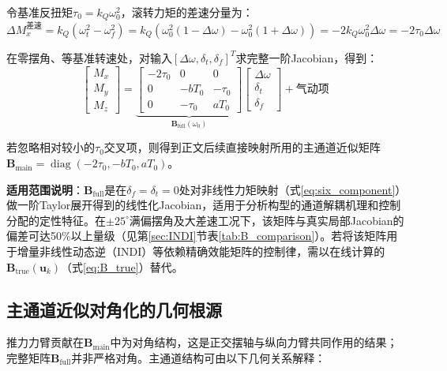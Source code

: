 令基准反扭矩$\tau_0 = k_Q \omega_0^2$，滚转力矩的差速分量为：
\begin{equation}
    \Delta M_x^{\text{差速}} = k_Q (\omega_t^2 - \omega_f^2)
    = k_Q (\omega_0^2(1-\Delta\omega) - \omega_0^2(1+\Delta\omega))
    = -2 k_Q \omega_0^2 \Delta\omega
    = -2 \tau_0 \Delta\omega
    \label{eq:differential_roll}
\end{equation}

在零摆角、等基准转速处，对输入$[\Delta\omega,\delta_t,\delta_f]^T$求完整一阶Jacobian，得到：
\begin{equation}
    \boxed{
    \begin{bmatrix} M_x \\ M_y \\ M_z \end{bmatrix}
    =
    \underbrace{
    \begin{bmatrix}
        -2\tau_0 & 0 & 0 \\
        0 & -b T_0 & -\tau_0 \\
        0 & -\tau_0 & a T_0
    \end{bmatrix}
    }_{\bm{B}_{\mathrm{full}}(\omega_0)}
    \begin{bmatrix} \Delta\omega \\ \delta_t \\ \delta_f \end{bmatrix}
    + \text{气动项}
    }
    \label{eq:effectiveness_matrix}
\end{equation}

若忽略相对较小的$\tau_0$交叉项，则得到正文后续直接映射所用的主通道近似矩阵
$\bm{B}_{\mathrm{main}}=\operatorname{diag}(-2\tau_0,-bT_0,aT_0)$。

\textbf{适用范围说明}：$\mathbf{B}_{\mathrm{full}}$是在$\delta_f=\delta_t=0$处对非线性力矩映射（式\ref{eq:six_component}）做一阶Taylor展开得到的线性化Jacobian，适用于分析构型的通道解耦机理和控制分配的定性特征。在$\pm 25^\circ$满偏摆角及大差速工况下，该矩阵与真实局部Jacobian的偏差可达50\%以上量级（见第\ref{sec:INDI}节表\ref{tab:B_comparison}）。若将该矩阵用于增量非线性动态逆（INDI）等依赖精确效能矩阵的控制律，需以在线计算的$\mathbf{B}_{\mathrm{true}}(\mathbf{u}_k)$（式\ref{eq:B_true}）替代。

\subsection{主通道近似对角化的几何根源}

推力力臂贡献在$\bm{B}_{\mathrm{main}}$中为对角结构，这是正交摆轴与纵向力臂共同作用的结果；
完整矩阵$\bm{B}_{\mathrm{full}}$并非严格对角。主通道结构可由以下几何关系解释：

